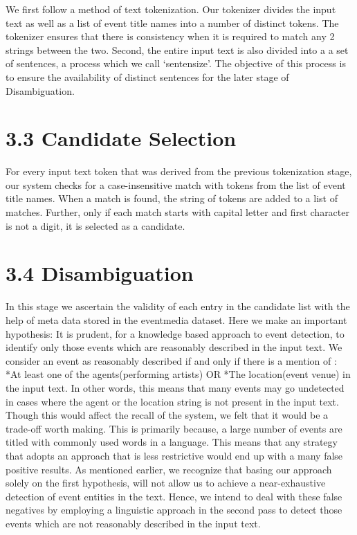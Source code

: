 \documentclass[a4paper,11pt]{report}
\begin{document}
We first follow a method of text tokenization. Our tokenizer divides the input text as well as a list of event title names into a number of distinct tokens. The tokenizer ensures that there is consistency when it is required to match any 2 strings between the two. Second, the entire input text is also divided into a a set of sentences, a process which we call `sentensize’. The objective of this process is to ensure the availability of distinct sentences for the later stage of Disambiguation. 


\section*{3.3 Candidate Selection}

For every input text token that was derived from the previous tokenization stage, our system checks for a case-insensitive match with tokens from the list of event title names. When a match is found, the string of tokens are added to a list of matches. Further, only if each match starts with capital letter and first character is not a digit, it is selected as a candidate.

\section*{3.4 Disambiguation}
In this stage we ascertain the validity of each entry in the candidate list with the help of meta data stored in the eventmedia dataset. Here we make an important hypothesis: It is prudent, for a knowledge based approach to event detection, to identify only those events which are reasonably described in the input text. We consider an event as reasonably described if and only if there is a mention of :
*At least one of the agents(performing artists)  OR *The location(event venue) in the input text. In other words, this means that many events may go undetected in cases where the agent or the location string is not present in the input text. Though this would affect the recall of the system, we felt that it would be a trade-off worth making. This is primarily because, a large number of events are titled with commonly used words in a language. This means that any strategy that adopts an approach that is less restrictive would end up with a many false positive results. As mentioned earlier, we recognize that basing our approach solely on the first hypothesis, will not allow us to achieve a near-exhaustive detection of event entities in the text. Hence, we intend to deal with these false negatives by employing a linguistic approach in the second pass to detect those events which are not reasonably described in the input text.
\end{document}
